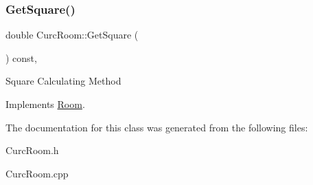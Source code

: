 \subsubsection{\texorpdfstring{Get\+Square()}{GetSquare()}}
{\footnotesize\ttfamily double Curc\+Room\+::\+Get\+Square (\begin{DoxyParamCaption}{ }\end{DoxyParamCaption}) const\hspace{0.3cm}{\ttfamily [override]}, {\ttfamily [virtual]}}

Square Calculating Method 

Implements \mbox{\hyperlink{class_room_a031b559260949b3fa9e27053aaf602f5}{Room}}.



The documentation for this class was generated from the following files\+:\begin{DoxyCompactItemize}
\item 
Curc\+Room.\+h\item 
Curc\+Room.\+cpp\end{DoxyCompactItemize}
